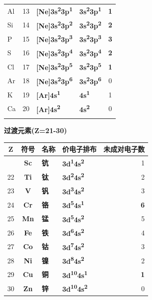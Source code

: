 {\begin{longtable}[]{@{}lcllc@{}}
Al & 13 & \textbf{{[}Ne{]}3s\textsuperscript{2}3p\textsuperscript{1}} & \textbf{3s\textsuperscript{2}3p\textsuperscript{1}} & \textbf{1} \\
Si & 14 & \textbf{{[}Ne{]}3s\textsuperscript{2}3p\textsuperscript{2}} & \textbf{3s\textsuperscript{2}3p\textsuperscript{2}} & \textbf{2} \\
P & 15 & \textbf{{[}Ne{]}3s\textsuperscript{2}3p\textsuperscript{3}} & \textbf{3s\textsuperscript{2}3p\textsuperscript{3}} & \textbf{3} \\
S & 16 & \textbf{{[}Ne{]}3s\textsuperscript{2}3p\textsuperscript{4}} & \textbf{3s\textsuperscript{2}3p\textsuperscript{4}} & \textbf{2} \\
Cl & 17 & \textbf{{[}Ne{]}3s\textsuperscript{2}3p\textsuperscript{5}} & \textbf{3s\textsuperscript{2}3p\textsuperscript{5}} & \textbf{1} \\
Ar & 18 & \textbf{{[}Ne{]}3s\textsuperscript{2}3p\textsuperscript{6}} & \textbf{3s\textsuperscript{2}3p\textsuperscript{6}} & 0 \\
K & 19 & \textbf{{[}Ar{]}4s\textsuperscript{1}} & \textbf{4s\textsuperscript{1}} & 1 \\
Ca & 20 & \textbf{{[}Ar{]}4s\textsuperscript{2}} & \textbf{4s\textsuperscript{2}} & 0 \\
& & & & \\
\end{longtable}
}

\textbf{过渡元素(Z=21-30)}

{\def\LTcaptype{none} %
\begin{longtable}[]{@{}ccllr@{}}
\toprule\noalign{}
Z & 符号 & 名称 & 价电子排布 & 未成对电子数 \\
\midrule\noalign{}
\endhead
\bottomrule\noalign{}
\endlastfoot
21 & \textbf{Sc} & \textbf{钪} & \textbf{3d\textsuperscript{1}4s\textsuperscript{2}} & 1 \\
22 & \textbf{Ti} & \textbf{钛} & \textbf{3d\textsuperscript{2}4s\textsuperscript{2}} & 2 \\
23 & \textbf{V} & \textbf{钒} & \textbf{3d\textsuperscript{3}4s\textsuperscript{2}} & 3 \\
24 & \textbf{Cr} & \textbf{铬} & \textbf{3d\textsuperscript{5}4s\textsuperscript{1}} & \textbf{6} \\
25 & \textbf{Mn} & \textbf{锰} & \textbf{3d\textsuperscript{5}4s\textsuperscript{2}} & 5 \\
26 & \textbf{Fe} & \textbf{铁} & \textbf{3d\textsuperscript{6}4s\textsuperscript{2}} & 4 \\
27 & \textbf{Co} & \textbf{钴} & \textbf{3d\textsuperscript{7}4s\textsuperscript{2}} & 3 \\
28 & \textbf{Ni} & \textbf{镍} & \textbf{3d\textsuperscript{8}4s\textsuperscript{2}} & 2 \\
29 & \textbf{Cu} & \textbf{铜} & \textbf{3d\textsuperscript{10}4s\textsuperscript{1}} & \textbf{1} \\
30 & \textbf{Zn} & \textbf{锌} & \textbf{3d\textsuperscript{10}4s\textsuperscript{2}} & 0 \\
\end{longtable}
}

